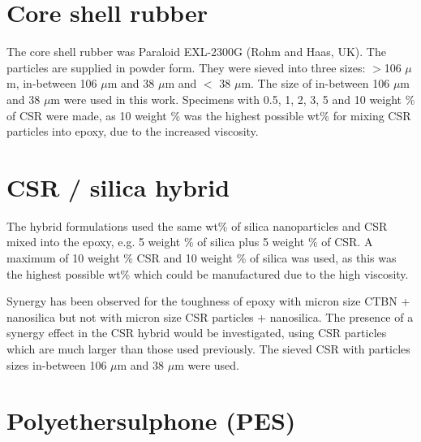 \documentclass[numbers=noendperiod,chapterprefix=on]{icldt} %
\begin{document}
\section{Core shell rubber}
The core shell rubber was Paraloid EXL-2300G (Rohm and Haas, UK). The particles are supplied in powder form. They were sieved into three sizes: $>$106 $\mu$m, in-between 106 $\mu$m and 38 $\mu$m and $<$ 38 $\mu$m. The size of in-between 106 $\mu$m and 38 $\mu$m were used in this work. Specimens with 0.5, 1, 2, 3, 5 and 10 weight \% of CSR were made, as 10 weight \% was the highest possible wt\% for mixing CSR particles into epoxy, due to the increased viscosity.

\section{CSR / silica hybrid}
The hybrid formulations used the same wt\% of silica nanoparticles and CSR mixed into the epoxy, e.g. 5 weight \% of silica plus 5 weight \% of CSR. A maximum of 10 weight \% CSR and 10 weight \% of silica was used, as this was the highest possible wt\% which could be manufactured due to the high viscosity.

Synergy has been observed for the toughness of epoxy with micron size CTBN + nanosilica \cite{Masania2010} but not with micron size CSR particles + nanosilica. The presence of a synergy effect in the CSR hybrid would be investigated, using CSR particles which are much larger than those used previously. The sieved CSR with particles sizes in-between 106 $\mu$m and 38 $\mu$m were used. 

\section{Polyethersulphone (PES)}
\end{document}
